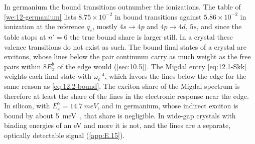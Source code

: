 In germanium the bound transitions outnumber the ionizations. The table of \cref{we:12-germanium} lists $8.75\times10^{-2}$ in bound transitions against $5.86\times10^{-2}$ in ionization at the reference $q_e$, mostly $4s \to 4p$ and $4p \to 4d,\,5s$, and since the table stops at $n' = 6$ the true bound share is larger still. In a crystal these valence transitions do not exist as such. The bound final states of a crystal are excitons, whose lines below the pair continuum carry as much weight as the free pairs within $8E_x^b$ of the edge would (\cref{sec:10.5}). The Migdal entry \cref{eq:12.1-Skk} weights each final state with $\omega_e^{-4}$, which favors the lines below the edge for the same reason as \cref{eq:12.2-bound}. The exciton share of the Migdal spectrum is therefore at least the share of the lines in the electronic response near the edge. In silicon, with $E_x^b = \SI{14.7}{meV}$, and in germanium, whose indirect exciton is bound by about \SI{5}{meV}~\cite{macfarlane1957fine}, that share is negligible. In wide-gap crystals with binding energies of an eV and more it is not, and the lines are a separate, optically detectable signal (\cref{app:E.15}).
